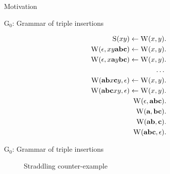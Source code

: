 \documentclass{beamer}
\newcommand\s{\textsc}
\begin{document}
	
	\begin{frame}{Motivation}
	\begin{center}
	\end{center}
	\end{frame}

	\begin{frame}{G$_0$: Grammar of triple insertions}
		\begin{figure}[h!]
		\begin{align}
		\setcounter{equation}{0}
		\s{S}(xy) \leftarrow \s{W}(x,y)&. \\
		\s{W}(\epsilon, xy\textbf{abc}) \leftarrow \s{W}(x,y)&. \\
		\s{W}(\epsilon, x\textbf{a}y\textbf{bc}) \leftarrow \s{W}(x,y)&. \\
		\dots \nonumber \\
		\setcounter{equation}{59}
		\s{W}(\textbf{ab}x\textbf{c}y, \epsilon) \leftarrow \s{W}(x,y)&. \\
		\s{W}(\textbf{abc}xy, \epsilon) \leftarrow \s{W}(x,y)&. \\
		\s{W}(\epsilon, \textbf{abc})&. \\
		\s{W}(\textbf{a}, \textbf{bc})&. \\
		\s{W}(\textbf{ab}, \textbf{c})&. \\
		\s{W}(\textbf{abc}, \epsilon)&.
		\end{align}
		\end{figure}
	\end{frame}

	\begin{frame}{G$_0$: Grammar of triple insertions}
		\begin{figure}[h!]
		\centering
		
		\caption*{Straddling counter-example}
		\end{figure}
	\end{frame}
\end{document}
